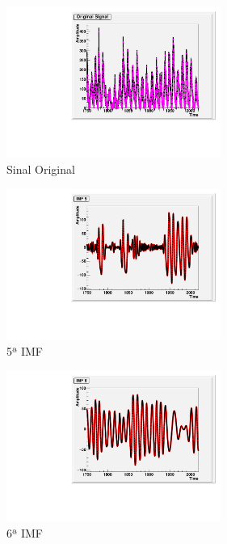 \documentclass[letterpaper]{article}
\begin{document}
\begin{multicols}{2}

\begin{center}
\begin{figure}[H]
\centering
    \includegraphics[width=7cm]{OriginalSignal_Sun.pdf}
    \caption{Sinal Original}
\end{figure}
\end{center}

\begin{center}
\begin{figure}[H]
\centering
    \includegraphics[width=7cm]{IMF5_Sun.pdf}
    \caption{5ª IMF}
\end{figure}
\end{center}

\begin{center}
\begin{figure}[H]
\centering
    \includegraphics[width=7cm]{IMF6_Sun.pdf}
    \caption{6ª IMF}
\end{figure}
\end{center}


\end{multicols}
\end{document}
